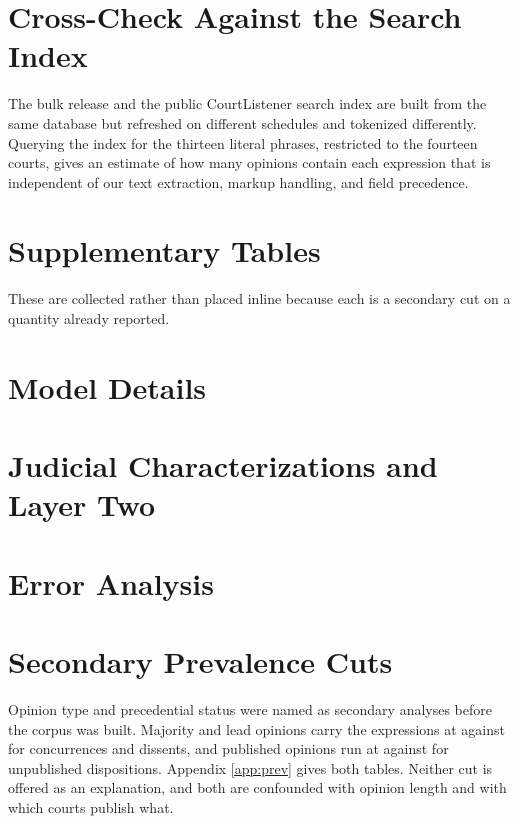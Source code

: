 \section{Cross-Check Against the Search Index}
\label{app:api}

The bulk release and the public CourtListener search index are built from the
same database but refreshed on different schedules and tokenized differently.
Querying the index for the thirteen literal phrases, restricted to the fourteen
courts, gives an estimate of how many opinions contain each expression that is
independent of our text extraction, markup handling, and field precedence.



\section{Supplementary Tables}
\label{app:supp}




These are collected rather than placed inline because each is a secondary cut on
a quantity already reported.

\section{Model Details}
\label{app:models}



\section{Judicial Characterizations and Layer Two}
\label{app:layer2}
\label{app:judicial}


\section{Error Analysis}
\label{app:errors}


\section{Secondary Prevalence Cuts}
Opinion type and precedential
status were named as secondary analyses before the corpus was built. Majority and
lead opinions carry the expressions at \PrevMajority{} against \PrevSeparate{}
for concurrences and dissents, and published opinions run at \PrevPub{} against
\PrevUnpub{} for unpublished dispositions. Appendix \ref{app:prev} gives both
tables. Neither cut is offered as an explanation, and both are confounded with
opinion length and with which courts publish what.

